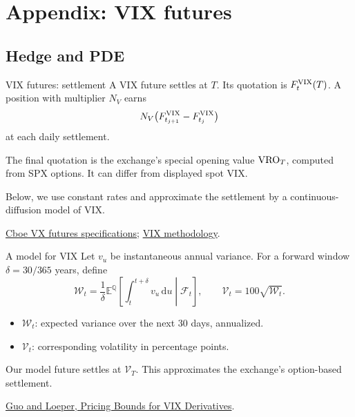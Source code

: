 \documentclass[handout,10pt,t,aspectratio=169]{beamer}
\newcommand{\E}{\mathbb E}
\newcommand{\Q}{\mathbb Q}
\newcommand{\F}{\mathcal F}
\newcommand{\dd}{\,\mathrm d}
\newcommand{\source}[1]{\vfill{\scriptsize\color{gray}#1\par}}
\begin{document}
\appendix

\section{Appendix: VIX futures}
\subsection{Hedge and PDE}

\begin{frame}{VIX futures: settlement}
\small
A VIX future settles at \(T\). Its quotation is \(F_t^{\rm VIX}(T)\).
A position with multiplier \(N_V\) earns
\[
 N_V\bigl(F_{t_{j+1}}^{\rm VIX}-F_{t_j}^{\rm VIX}\bigr)
\]
at each daily settlement.

The final quotation is the exchange's special opening value \({\rm VRO}_T\),
computed from SPX options. It can differ from displayed spot VIX.

\medskip
Below, we use constant rates and approximate the settlement by a
continuous-diffusion model of VIX.
\source{\href{https://www.cboe.com/tradable-products/vix/vix-futures/specifications/}
{Cboe VX futures specifications};
\href{https://cdn.cboe.com/resources/vix/VIX_Methodology.pdf}{VIX methodology}.}
\end{frame}

\begin{frame}{A model for VIX}
\small
Let \(v_u\) be instantaneous annual variance. For a forward window
\(\delta=30/365\) years, define
\[
 \mathcal W_t=\frac1\delta\E^\Q\!\left[
 \int_t^{t+\delta}v_u\dd u\middle|\F_t\right],
 \qquad \mathcal V_t=100\sqrt{\mathcal W_t}.
\]
\begin{itemize}
\item \(\mathcal W_t\): expected variance over the next 30 days, annualized.
\item \(\mathcal V_t\): corresponding volatility in percentage points.
\end{itemize}
Our model future settles at \(\mathcal V_T\).
This approximates the exchange's option-based settlement.
\source{\href{https://arxiv.org/abs/1611.00464}{Guo and Loeper, Pricing Bounds for VIX Derivatives}.}
\end{frame}
\end{document}
